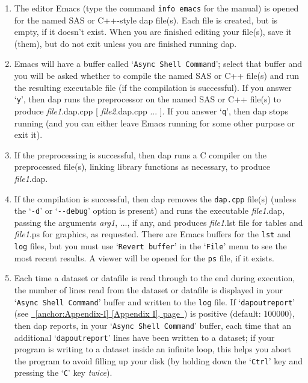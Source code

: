 \documentclass{book}
\newcommand\Texinfocommandstyletextvar[1]{{\normalfont{}\textsl{#1}}}%
\renewcommand{\_}{\Texinfounderscore\discretionary{}{}{}}
\begin{document}
\begin{enumerate}[start=1]
\item The editor Emacs (type the command \texttt{info emacs}
for the manual) is opened for the named SAS or C++-style dap file(s).
Each file is created, but is empty, if it doesn't exist.
When you are finished editing your file(s), save it (them), but do not
exit unless you are finished running dap.
\item Emacs will have a buffer called `\texttt{Async Shell Command}'; select that buffer
and you will be
asked whether to compile the named SAS or C++ file(s) and run the resulting
executable file (if the compilation is successful).
If you answer `\texttt{y}', then dap
runs the preprocessor on the named SAS or C++ file(s) to produce
\Texinfocommandstyletextvar{file1}.dap.cpp [ \Texinfocommandstyletextvar{file2}.dap.cpp ... ].
If you answer `\texttt{q}', then dap stops running (and you can either leave Emacs
running for some other purpose or exit it).

\item If the preprocessing is successful, 
then dap runs a C compiler on the preprocessed file(s), linking
library functions as necessary, to produce \Texinfocommandstyletextvar{file1}.dap.
\item If the compilation is successful, then dap removes the \texttt{dap.cpp} file(s)
(unless the `\texttt{-d}' or `\texttt{{-}{-}debug}' option is present) and
runs the executable \Texinfocommandstyletextvar{file1}.dap, passing the arguments
\Texinfocommandstyletextvar{arg1}, ..., if any, and produces \Texinfocommandstyletextvar{file1}.lst file for tables
%
%
and \Texinfocommandstyletextvar{file1}.ps for graphics, as requested.
%
%
There are Emacs buffers for
the \texttt{lst} and \texttt{log} files, but you must use
`\texttt{Revert buffer}'
%
in the `\texttt{File}' menu to see the most recent results.
A viewer will be opened for the \texttt{ps} file,
if it exists.

\item Each time a dataset or datafile is read through to the end
during execution, the number
of lines read from the dataset or datafile is displayed in your
`\texttt{Async Shell Command}' buffer and written to the \texttt{log} file.
If `\texttt{dap\_outreport}' (see \hyperref[anchor:Appendix-I]{\chaptername~\ref*{anchor:Appendix-I} [Appendix I], page~\pageref*{anchor:Appendix-I}}) is positive
(default: 100000), then dap reports, in your `\texttt{Async Shell Command}' buffer,
each time that an additional `\texttt{dap\_outreport}'
lines have been written to a dataset;
if your program is writing to a dataset inside an infinite loop,
this helps you abort the program to avoid filling up your disk
(by holding down the `\texttt{Ctrl}' key and pressing the `\texttt{C}' key \emph{twice}).
%


\end{enumerate}
\end{document}
